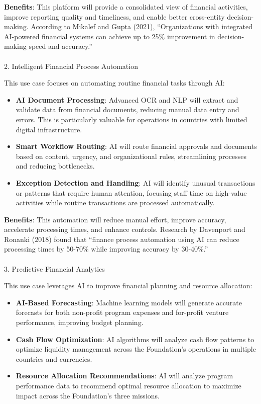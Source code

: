 \documentclass[
]{article}
\makeatletter
\let\oldparagraph\paragraph
\renewcommand{\paragraph}{
    \@ifstar
      \xxxParagraphStar
      \xxxParagraphNoStar
  }
\newcommand{\xxxParagraphStar}[1]{\oldparagraph*{#1}\mbox{}}
\newcommand{\xxxParagraphNoStar}[1]{\oldparagraph{#1}\mbox{}}
\makeatother
\begin{document}
\textbf{Benefits}: This platform will provide a consolidated view of
financial activities, improve reporting quality and timeliness, and
enable better cross-entity decision-making. According to Mikalef and
Gupta (2021), ``Organizations with integrated AI-powered financial
systems can achieve up to 25\% improvement in decision-making speed and
accuracy.''

\paragraph{2. Intelligent Financial Process
Automation}\label{intelligent-financial-process-automation}

This use case focuses on automating routine financial tasks through AI:

\begin{itemize}
\item
  \textbf{AI Document Processing}: Advanced OCR and NLP will extract and
  validate data from financial documents, reducing manual data entry and
  errors. This is particularly valuable for operations in countries with
  limited digital infrastructure.
\item
  \textbf{Smart Workflow Routing}: AI will route financial approvals and
  documents based on content, urgency, and organizational rules,
  streamlining processes and reducing bottlenecks.
\item
  \textbf{Exception Detection and Handling}: AI will identify unusual
  transactions or patterns that require human attention, focusing staff
  time on high-value activities while routine transactions are processed
  automatically.
\end{itemize}

\textbf{Benefits}: This automation will reduce manual effort, improve
accuracy, accelerate processing times, and enhance controls. Research by
Davenport and Ronanki (2018) found that ``finance process automation
using AI can reduce processing times by 50-70\% while improving accuracy
by 30-40\%.''

\paragraph{3. Predictive Financial
Analytics}\label{predictive-financial-analytics}

This use case leverages AI to improve financial planning and resource
allocation:

\begin{itemize}
\item
  \textbf{AI-Based Forecasting}: Machine learning models will generate
  accurate forecasts for both non-profit program expenses and for-profit
  venture performance, improving budget planning.
\item
  \textbf{Cash Flow Optimization}: AI algorithms will analyze cash flow
  patterns to optimize liquidity management across the Foundation's
  operations in multiple countries and currencies.
\item
  \textbf{Resource Allocation Recommendations}: AI will analyze program
  performance data to recommend optimal resource allocation to maximize
  impact across the Foundation's three missions.
\end{itemize}
\end{document}
